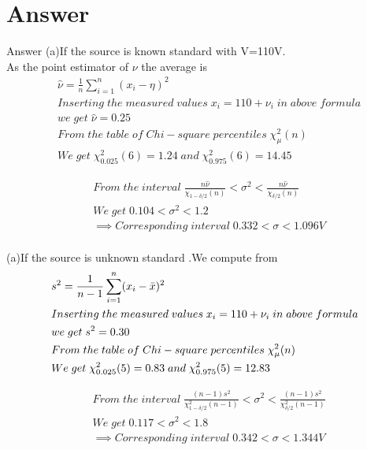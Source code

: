 \documentclass{beamer}
\begin{document}
\section{Answer}
\begin{frame}{Answer}
(a)If the source is known standard with V=110V.\\
As the point estimator of $\nu$ the average is\\
\begin{align}
    &\hat{\nu}=\frac{1}{n}\sum_{i=1}^{n} (x_i-\eta)^{2}\\
    &Inserting\;the\;measured\;values\;{x_i=110+\nu_i}\;in\;above\; formula\\
    &we\;get\;\hat{\nu}=0.25\\
    &From\;the\;table\;of\;Chi-square\;percentiles\;\chi^2_\mu(n)\\
    &We\;get\; \chi^2_{0.025}(6)=1.24\;and\;\chi^2_{0.975}(6)=14.45
\end{align}
\end{frame}
\begin{frame}
\begin{align}
      &From\;the\;interval\;\frac{n\hat{\nu}}{\chi_{1-\delta/2}(n)}<\sigma^2<\frac{n\hat{\nu}}{\chi_{\delta/2}(n)}\\
      &We\;get\;{0.104}<\sigma^2<{1.2}\\
      &\implies Corresponding\;interval\;{0.332}<\sigma<{1.096}V\\
\end{align}
\end{frame}
\begin{frame}
(a)If the source is unknown standard .We compute from\\
\begin{align}
    &s^2=\frac{1}{n-1}\sum_{i=1}^{n} (x_i-\Bar{x})^{2}\\
    &Inserting\;the\;measured\;values\;{x_i=110+\nu_i}\;in\;above\; formula\\
    &we\;get\;s^2=0.30\\
    &From\;the\;table\;of\;Chi-square\;percentiles\;\chi^2_\mu(n)\\
    &We\;get\; \chi^2_{0.025}(5)=0.83\;and\;\chi^2_{0.975}(5)=12.83
\end{align}
\end{frame}
\begin{frame}
\begin{align}
      &From\;the\;interval\;\frac{(n-1)s^2}{\chi^2_{1-\delta/2}(n-1)}<\sigma^2<\frac{(n-1)s^2}{\chi^2_{\delta/2}(n-1)}\\
      &We\;get\;{0.117}<\sigma^2<{1.8}\\
      &\implies Corresponding\;interval\;{0.342}<\sigma<{1.344}V\\
\end{align}
\end{frame}
\end{document}
